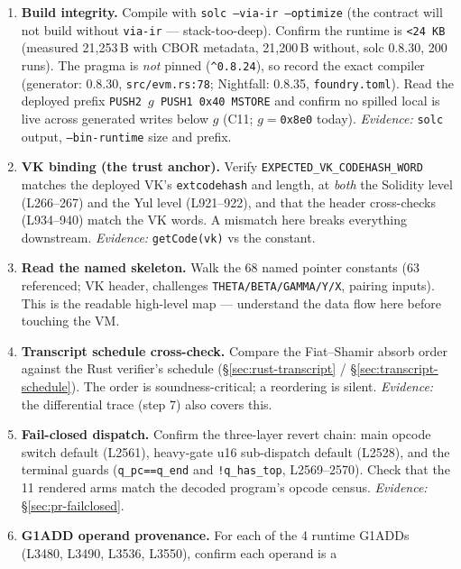 \begin{enumerate}[leftmargin=1.6em,itemsep=4pt]
\item \textbf{Build integrity.} Compile with
  \texttt{solc --via-ir --optimize} (the contract will not build
  without \texttt{via-ir} --- stack-too-deep). Confirm the
  runtime is \texttt{<24\,KB} (measured 21{,}253\,B with CBOR
  metadata, 21{,}200\,B without, solc 0.8.30, 200 runs). The
  pragma is \emph{not} pinned (\texttt{\^{}0.8.24}), so record the
  exact compiler (generator: 0.8.30, \texttt{src/evm.rs:78};
  Nightfall: 0.8.35, \texttt{foundry.toml}). Read the deployed
  prefix \texttt{PUSH2 }$g$\texttt{ PUSH1 0x40 MSTORE} and confirm
  no spilled local is live across generated writes below $g$
  (C11; $g=$\texttt{0x8e0} today). \emph{Evidence:} \texttt{solc} output,
  \texttt{--bin-runtime} size and prefix.
\item \textbf{VK binding (the trust anchor).} Verify
  \texttt{EXPECTED\_\allowbreak{}VK\_\allowbreak{}CODEHASH\_\allowbreak{}WORD} matches the deployed
  VK's \texttt{extcodehash} and length, at \emph{both} the Solidity level
  (L266--267) and the Yul level (L921--922), and that the header
  cross-checks (L934--940) match the VK words. A mismatch here breaks
  everything downstream. \emph{Evidence:}
  \texttt{getCode(vk)} vs the constant.
\item \textbf{Read the named skeleton.} Walk the 68 named
  pointer constants (63 referenced; VK header, challenges
  \texttt{THETA/\allowbreak{}BETA/\allowbreak{}GAMMA/\allowbreak{}Y/\allowbreak{}X}, pairing inputs). This is the
  readable high-level map --- understand the data flow here
  before touching the VM.
\item \textbf{Transcript schedule cross-check.} Compare the
  Fiat--Shamir absorb order against the Rust verifier's
  schedule (\S\ref{sec:rust-transcript} / \S\ref{sec:transcript-schedule}). The order is
  soundness-critical; a reordering is silent. \emph{Evidence:}
  the differential trace (step 7) also covers this.
\item \textbf{Fail-closed dispatch.} Confirm the three-layer
  revert chain: main opcode switch default (L2561), heavy-gate
  u16 sub-dispatch default (L2528), and the terminal guards
  (\texttt{q\_pc==q\_end} and \texttt{!q\_has\_top}, L2569--2570).
  Check that the 11 rendered arms match the decoded program's
  opcode census.
  \emph{Evidence:} \S\ref{sec:pr-failclosed}.
\item \textbf{G1ADD operand provenance.} For each of the 4
  runtime G1ADDs (L3480, L3490, L3536, L3550), confirm each operand is a

\end{enumerate}

